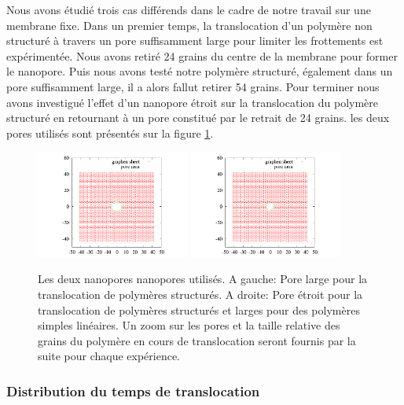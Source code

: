 \documentclass[a4paper,11pt]{article}
\begin{document}
 
 Nous avons étudié trois cas différends dans le cadre de notre travail sur une membrane fixe. Dans un premier temps, la translocation d'un polymère non structuré à travers un pore suffisamment large pour limiter les frottements est expérimentée. Nous avons retiré 24 grains du centre de la membrane pour former le nanopore. Puis nous avons testé notre polymère structuré, également dans un pore suffisamment large, il a alors fallut retirer 54 grains. Pour terminer nous avons investigué l'effet d'un nanopore étroit sur la translocation du polymère structuré en retournant à un pore constitué par le retrait de 24 grains. les deux pores utilisés sont présentés sur la figure \ref{bothpores}.
 \begin{figure}[H]
\begin{center}
\includegraphics[width=0.45\textwidth]{holebigger.pdf} \includegraphics[width=0.45\textwidth]{holesmall.pdf}

\caption{Les deux nanopores nanopores utilisés. A gauche: Pore large pour la translocation de polymères structurés. A droite: Pore étroit pour la translocation de polymères structurés et larges pour des polymères simples linéaires. Un zoom sur les pores et la taille relative des grains du polymère en cours de translocation seront fournis par la suite  pour chaque expérience.}
\label{bothpores}
\end{center}
\end{figure}

\subsubsection{Distribution du temps de translocation}
\end{document}
